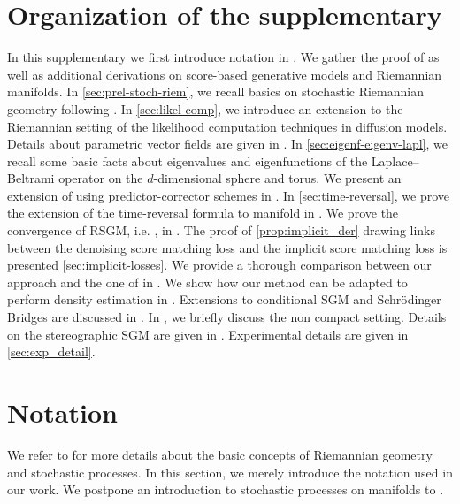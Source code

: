 \section{Organization of the supplementary}
\label{sec:organ-suppl}

In this supplementary we first introduce notation in .
We gather the proof of  as well as additional derivations on score-based generative models and Riemannian manifolds.
In \cref{sec:prel-stoch-riem}, we recall basics on stochastic Riemannian geometry following \textcite{hsu2002stochastic}.
In \cref{sec:likel-comp}, we introduce an extension to the Riemannian setting of the likelihood computation techniques in diffusion models.
Details about parametric vector fields are given in .
In \cref{sec:eigenf-eigenv-lapl}, we recall some basic facts about eigenvalues and eigenfunctions of the Laplace--Beltrami operator on the $d$-dimensional sphere and torus.
We present an extension of  using predictor-corrector schemes in .
In \cref{sec:time-reversal}, we prove the extension of the time-reversal formula to manifold in .
We prove the convergence of RSGM, i.e. , in .
The proof of \cref{prop:implicit_der} drawing links between the denoising score matching loss and the implicit score matching loss is presented \cref{sec:implicit-losses}.
We provide a thorough comparison between our approach and the one of \textcite{rozen2021moser} in .
We show how our method can be adapted to perform density estimation in .
Extensions to conditional SGM and Schr\"odinger Bridges are discussed in .
In , we briefly discuss the non compact setting.
Details on the stereographic SGM are given in .
Experimental details are given in \cref{sec:exp_detail}.

\section{Notation}
\label{sec:notation-1}

We refer to  for more details about the basic concepts of Riemannian geometry and stochastic processes.
In this section, we merely introduce the notation used in our work.
We postpone an introduction to stochastic processes on manifolds to .

